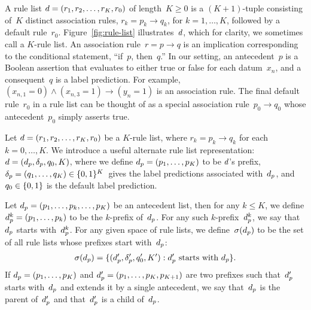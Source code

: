 A rule list ${{d} = (r_1, r_2, \dots, r_K, r_0)}$ of length~${K \ge 0}$
is a ${(K+1)}$-tuple consisting of~$K$ distinct association rules,
${r_k = p_k \rightarrow q_k}$, for ${k = 1, \dots, K}$,
followed by a default rule~$r_0$.
%
Figure~\ref{fig:rule-list} illustrates~${d}$,
which for clarity, we sometimes call a $K$-rule list.
%
An association rule~${r = p \rightarrow q}$ is an implication
corresponding to the conditional statement, ``if~$p$, then~$q$.''
%
In our setting, an antecedent~$p$ is a Boolean assertion that
evaluates to either true or false for each datum~$x_n$,
and a consequent~$q$ is a label prediction.
%
For example, ${(x_{n, 1} = 0) \wedge (x_{n, 3} = 1) \rightarrow (y_n = 1)}$
is an association rule.
%
%
The final default rule~$r_0$ in a rule list can be thought of
as a special association rule~${p_0 \rightarrow q_0}$
whose antecedent~$p_0$ simply asserts true.

Let ${{d} = (r_1, r_2, \dots, r_K, r_0)}$ be a $K$-rule list,
where ${r_k = p_k \rightarrow q_k}$ for each ${k = 0, \dots, K}$.
%
We introduce a useful alternate rule list representation:
${{d} = (d_p, \delta_p, q_0, K)}$,
where we define ${d_p = (p_1, \dots, p_K)}$ to be ${d}$'s prefix,
${\delta_p = (q_1, \dots, q_K) \in \{0, 1\}^K}$~gives
the label predictions associated with~$d_p$,
and ${q_0 \in \{0, 1\}}$ is the default label prediction.

Let ${d_p = (p_1, \dots, p_k, \dots, p_K)}$ be an antecedent list,
then for any ${k \le K}$, we define ${d_p^k = (p_1, \dots, p_k)}$
to be the $k$-prefix of~$d_p$.
%
For any such $k$-prefix~$d_p^k$,
we say that~$d_p$ starts with~$d_p^k$.
%
For any given space of rule lists,
we define~$\sigma(d_p)$ to be the set of
all rule lists whose prefixes start with~$d_p$:
\begin{align}
\StartsWith(\Prefix) =
\{(\Prefix', \Labels', \Default', K') : \Prefix' \textnormal{ starts with } \Prefix \}.
\label{eq:starts-with}
\end{align}
%
If ${d_p = (p_1, \dots, p_K)}$ and ${d_p' = (p_1, \dots, p_K, p_{K+1})}$
are two prefixes such that~$d_p'$ starts with~$d_p$ and extends it by
a single antecedent, we say that~$d_p$ is the parent of~$d_p'$
and that~$d_p'$ is a child of~$d_p$.

